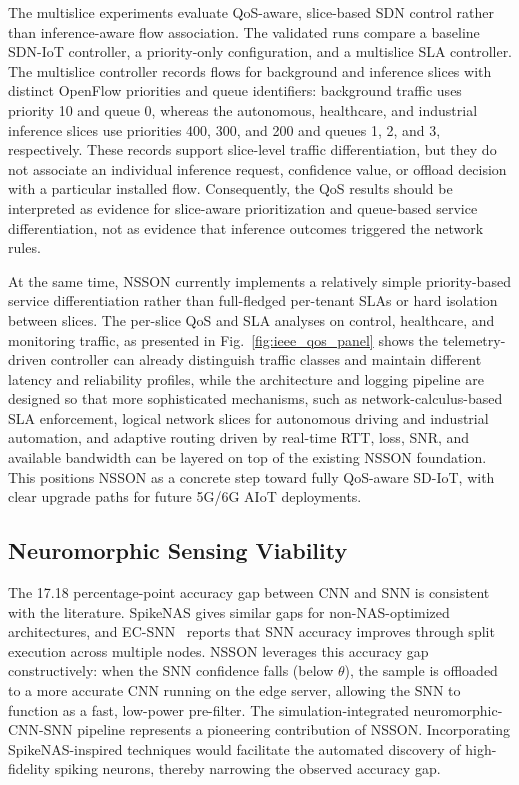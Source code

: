 \documentclass[journal]{IEEEtran}
\newcommand{\revblue}[1]{\textcolor{revblue}{#1}}
\begin{document}
\revblue{The multislice experiments evaluate QoS-aware, slice-based SDN
control rather than inference-aware flow association. The validated runs
compare a baseline SDN-IoT controller, a priority-only configuration, and
a multislice SLA controller. The multislice controller records flows for
background and inference slices with distinct OpenFlow priorities and
queue identifiers: background traffic uses priority 10 and queue 0,
whereas the autonomous, healthcare, and industrial inference slices use
priorities 400, 300, and 200 and queues 1, 2, and 3, respectively. These
records support slice-level traffic differentiation, but they do not
associate an individual inference request, confidence value, or offload
decision with a particular installed flow. Consequently, the QoS results
should be interpreted as evidence for slice-aware prioritization and
queue-based service differentiation, not as evidence that inference
outcomes triggered the network rules.}

\revblue{At the same time, NSSON currently implements a relatively simple
priority-based service differentiation rather than full-fledged
per-tenant SLAs or hard isolation between slices. The per-slice QoS and
SLA analyses on control, healthcare, and monitoring traffic, as presented in
Fig.~\ref{fig:ieee_qos_panel} shows the telemetry-driven controller can
already distinguish traffic classes and maintain different latency and
reliability profiles, while the architecture and logging pipeline are
designed so that more sophisticated mechanisms, such as
network-calculus-based SLA enforcement, logical network slices for
autonomous driving and industrial automation, and adaptive routing driven
by real-time RTT, loss, SNR, and available bandwidth can be layered on
top of the existing NSSON foundation. This positions NSSON as a concrete
step toward fully QoS-aware SD-IoT, with clear upgrade paths for future
5G/6G AIoT deployments.}

\subsection{Neuromorphic Sensing Viability}
The 17.18 percentage-point accuracy gap between CNN and SNN is consistent
with the literature. SpikeNAS \cite{putra2025spikenas} gives similar gaps for non-NAS-optimized architectures, and EC-SNN~\cite{di2024ec} reports that SNN accuracy improves through split execution across multiple nodes. NSSON leverages this accuracy gap constructively: when the SNN confidence falls (below $\theta$), the sample is offloaded to a more accurate CNN running on the edge server, allowing the SNN to function as a fast, low-power pre-filter. The simulation-integrated neuromorphic-CNN-SNN pipeline represents a pioneering contribution of NSSON. Incorporating SpikeNAS-inspired techniques would facilitate the automated discovery of high-fidelity spiking neurons, thereby narrowing the observed accuracy gap.
\end{document}
